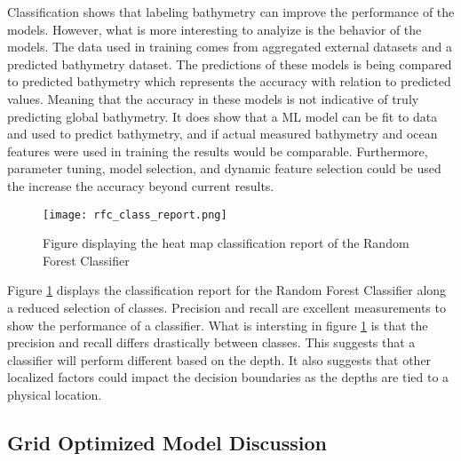 \par
Classification shows that labeling bathymetry can improve the performance of the models.
However, what is more interesting to analyize is the behavior of the models.
The data used in training comes from aggregated external datasets and a predicted bathymetry dataset.
The predictions of these models is being compared to predicted bathymetry which represents the accuracy with relation to predicted values.
Meaning that the accuracy in these models is not indicative of truly predicting global bathymetry.
It does show that a \ac{ML} model can be fit to data and used to predict bathymetry, and if actual measured bathymetry and ocean features were used in training the results would be comparable.
Furthermore, parameter tuning, model selection, and dynamic feature selection could be used the increase the accuracy beyond current results.

\begin{figure}[h]
    \centering
    \texttt{[image: rfc\_class\_report.png]}
    \caption{Figure displaying the heat map classification report of the Random Forest Classifier}
    \label{fig:rfc_report}
\end{figure}

\par
Figure \ref{fig:rfc_report} displays the classification report for the Random Forest Classifier along a reduced selection of classes.
Precision and recall are excellent measurements to show the performance of a classifier.
What is intersting in figure \ref{fig:rfc_report} is that the precision and recall differs drastically between classes.
This suggests that a classifier will perform different based on the depth.
It also suggests that other localized factors could impact the decision boundaries as the depths are tied to a physical location.

\subsection{Grid Optimized Model Discussion}


